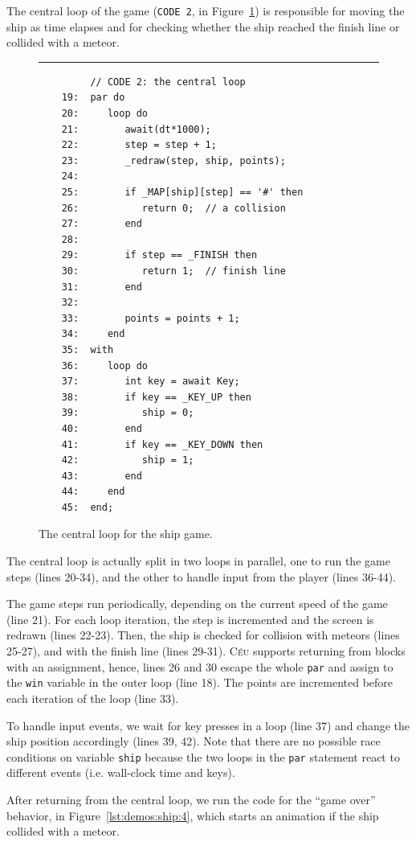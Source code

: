 \documentclass[11pt,a4paper]{article}
\newcommand{\2}{\;\;}
\newcommand{\5}{\;\;\;\;\;}
\newcommand{\CEU}{\textsc{C\'{e}u}}
\newcommand{\code}[1] {{\small{\texttt{#1}}}}
\begin{document}
The central loop of the game (\code{CODE 2}, in Figure~\ref{lst:demos:ship:3}) 
is responsible for moving the ship as time elapses and for checking whether the 
ship reached the finish line or collided with a meteor.

\begin{figure}[h!]
\rule{15cm}{0.37pt}
{\small
\begin{verbatim}
         // CODE 2: the central loop
    19:  par do
    20:     loop do
    21:        await(dt*1000);
    22:        step = step + 1;
    23:        _redraw(step, ship, points);
    24:
    25:        if _MAP[ship][step] == '#' then
    26:           return 0;  // a collision
    27:        end
    28:
    29:        if step == _FINISH then
    30:           return 1;  // finish line
    31:        end
    32:
    33:        points = points + 1;
    34:     end
    35:  with
    36:     loop do
    37:        int key = await Key;
    38:        if key == _KEY_UP then
    39:           ship = 0;
    40:        end
    41:        if key == _KEY_DOWN then
    42:           ship = 1;
    43:        end
    44:     end
    45:  end;
\end{verbatim}
}
\caption{ The central loop for the ship game.
\label{lst:demos:ship:3}
}
\end{figure}

The central loop is actually split in two loops in parallel, one to run the 
game steps (lines 20-34), and the other to handle input from the player (lines 
36-44).

The game steps run periodically, depending on the current speed of the game 
(line 21).
For each loop iteration, the step is incremented and the screen is redrawn 
(lines 22-23).
Then, the ship is checked for collision with meteors (lines 25-27), and with 
the finish line (lines 29-31).
\CEU{} supports returning from blocks with an assignment, hence, lines 26 and 
30 escape the whole \code{par} and assign to the \code{win} variable in the 
outer loop (line 18).
The points are incremented before each iteration of the loop (line 33).

To handle input events, we wait for key presses in a loop (line 37) and change 
the ship position accordingly (lines 39, 42).
Note that there are no possible race conditions on variable \code{ship} because 
the two loops in the \code{par} statement react to different events (i.e. 
wall-clock time and keys).

After returning from the central loop, we run the code for the ``game over'' 
behavior, in Figure~\ref{lst:demos:ship:4}, which starts an animation if the 
ship collided with a meteor.
\end{document}
